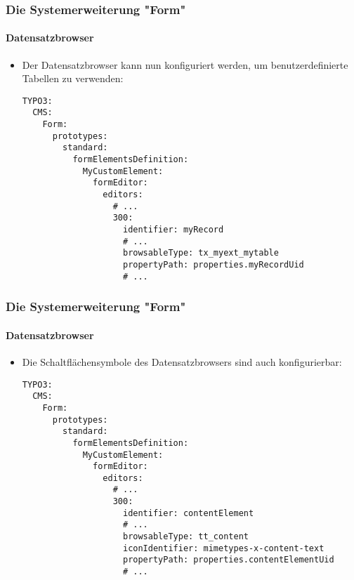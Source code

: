 
\begin{frame}[fragile]
	\frametitle{Die Systemerweiterung "Form"}
	\framesubtitle{Datensatzbrowser}

	\lstset{basicstyle=\tiny\ttfamily}

	\begin{itemize}
		\item Der Datensatzbrowser kann nun konfiguriert werden, um benutzerdefinierte Tabellen zu verwenden:
\begin{lstlisting}
TYPO3:
  CMS:
    Form:
      prototypes:
        standard:
          formElementsDefinition:
            MyCustomElement:
              formEditor:
                editors:
                  # ...
                  300:
                    identifier: myRecord
                    # ...
                    browsableType: tx_myext_mytable
                    propertyPath: properties.myRecordUid
                    # ...
\end{lstlisting}

	\end{itemize}

\end{frame}


\begin{frame}[fragile]
	\frametitle{Die Systemerweiterung "Form"}
	\framesubtitle{Datensatzbrowser}

	\lstset{basicstyle=\tiny\ttfamily}

	\begin{itemize}
		\item Die Schaltflächensymbole des Datensatzbrowsers sind auch konfigurierbar:
\begin{lstlisting}
TYPO3:
  CMS:
    Form:
      prototypes:
        standard:
          formElementsDefinition:
            MyCustomElement:
              formEditor:
                editors:
                  # ...
                  300:
                    identifier: contentElement
                    # ...
                    browsableType: tt_content
                    iconIdentifier: mimetypes-x-content-text
                    propertyPath: properties.contentElementUid
                    # ...
\end{lstlisting}

	\end{itemize}

\end{frame}

